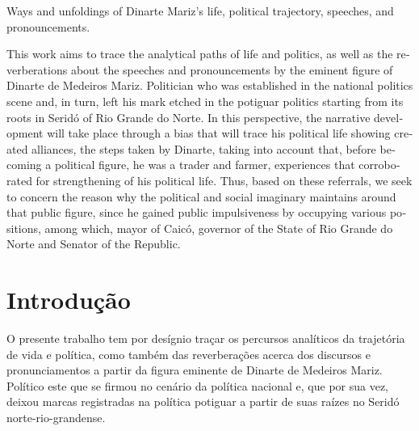 \begin{refsection}
    \begin{otherlanguage}{english}
    
    \fakeChapterOneLine
    {Ways and unfoldings of Dinarte Mariz's life, political trajectory, speeches, and pronouncements.}

    \begin{galoResumo}[Abstract]
        This work aims to trace the analytical paths of life and politics, as well as the reverberations about the speeches and pronouncements by the eminent figure of Dinarte de Medeiros Mariz. Politician who was established in the national politics scene and, in turn, left his mark etched in the potiguar politics starting from its roots in Seridó of Rio Grande do Norte. In this perspective, the narrative development will take place through a bias that will trace his political life showing created alliances, the steps taken by Dinarte, taking into account that, before becoming a political figure, he was a trader and farmer, experiences that corroborated for strengthening of his political life. Thus, based on these referrals, we seek to concern the reason why the political and social imaginary maintains around that public figure, since he gained public impulsiveness by occupying various positions, among which, mayor of Caicó, governor of the State of Rio Grande do Norte and Senator of the Republic.
    \end{galoResumo}
    
    \end{otherlanguage}

    \section{Introdução}

    O presente trabalho tem por desígnio traçar os percursos analíticos da trajetória de vida e política, como também das reverberações acerca dos discursos e pronunciamentos a partir da figura eminente de Dinarte de Medeiros Mariz. Político este que se firmou no cenário da política nacional e, que por sua vez, deixou marcas registradas na política potiguar a partir de suas raízes no Seridó norte-rio-grandense.  


\end{refsection}

